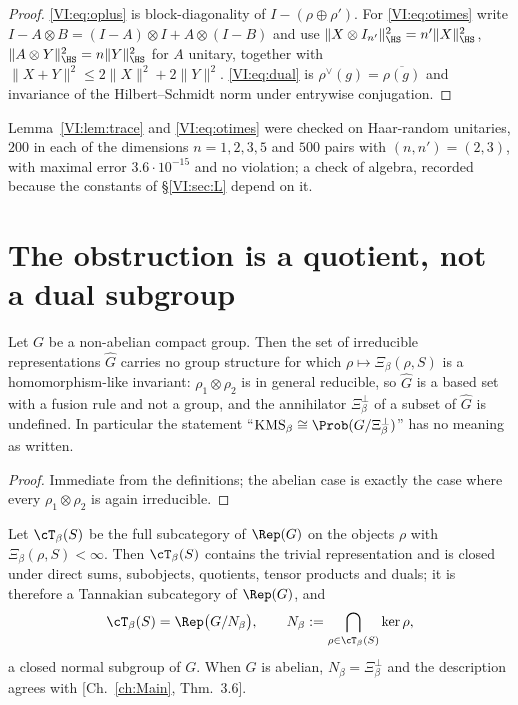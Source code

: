 \begin{proof}
\eqref{VI:eq:oplus} is block-diagonality of $I-(\rho\oplus\rho')$. For \eqref{VI:eq:otimes} write
$I-A\otimes B=(I-A)\otimes I+A\otimes(I-B)$ and use
$\|X\otimes I_{n'}\|_{\HS}^2=n'\|X\|_{\HS}^2$, $\|A\otimes Y\|_{\HS}^2=n\|Y\|_{\HS}^2$ for
$A$ unitary, together with $\|X+Y\|^2\le2\|X\|^2+2\|Y\|^2$. \eqref{VI:eq:dual} is
$\rho^\vee(g)=\overline{\rho(g)}$ and invariance of the Hilbert--Schmidt norm under entrywise
conjugation.
\end{proof}

\begin{remark}\label{VI:rem:num1}
Lemma~\ref{VI:lem:trace} and \eqref{VI:eq:otimes} were checked on Haar-random unitaries, $200$ in
each of the dimensions $n=1,2,3,5$ and $500$ pairs with $(n,n')=(2,3)$, with maximal error
$3.6\cdot10^{-15}$ and no violation; a check of algebra, recorded because the constants
of \S\ref{VI:sec:L} depend on it.
\end{remark}

\section{The obstruction is a quotient, not a dual subgroup}\label{VI:sec:tannaka}

\begin{proposition}\label{VI:prop:failure}
Let $G$ be a non-abelian compact group. Then the set of irreducible representations
$\widehat G$ carries no group structure for which $\rho\mapsto\Xi_\beta(\rho,S)$ is a
homomorphism-like invariant: $\rho_1\otimes\rho_2$ is in general reducible, so
$\widehat G$ is a based set with a fusion rule and not a group, and the annihilator
$\Xi_\beta^\perp$ of a subset of $\widehat G$ is undefined. In particular the statement
``$\mathrm{KMS}_\beta\cong\Prob(G/\Xi_\beta^\perp)$'' has no meaning as written.
\end{proposition}

\begin{proof}
Immediate from the definitions; the abelian case is exactly the case where every
$\rho_1\otimes\rho_2$ is again irreducible.
\end{proof}

\begin{theorem}\label{VI:thm:tannaka}
Let $\cT_\beta(S)$ be the full subcategory of $\Rep(G)$ on the objects $\rho$ with
$\Xi_\beta(\rho,S)<\infty$. Then $\cT_\beta(S)$ contains the trivial representation and is
closed under direct sums, subobjects, quotients, tensor products and duals; it is therefore a
Tannakian subcategory of $\Rep(G)$, and
\[
\cT_\beta(S)=\Rep\bigl(G/N_\beta\bigr),
\qquad
N_\beta:=\bigcap_{\rho\in\cT_\beta(S)}\ker\rho ,
\]
a closed normal subgroup of $G$. When $G$ is abelian, $N_\beta=\Xi_\beta^\perp$ and the
description agrees with [Ch.~\ref{ch:Main}, Thm.~3.6].
\end{theorem}

